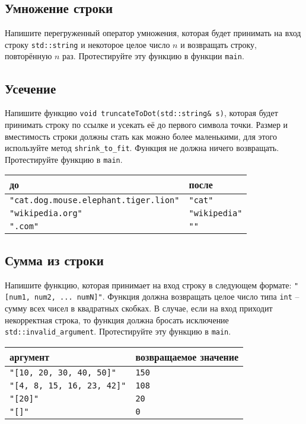 \documentclass{article}
\begin{document}
\subsection{Умножение строки}
Напишите перегруженный оператор умножения, которая будет принимать на вход строку \texttt{std::string} и некоторое целое число $n$ и возвращать строку, повторённую $n$ раз. Протестируйте эту функцию в функции \texttt{main}.


\subsection{Усечение}
Напишите функцию \texttt{void truncateToDot(std::string\& s)}, которая будет принимать строку по ссылке и усекать её до первого символа точки. Размер и вместимость строки должны стать как можно более маленькими, для этого используйте метод \texttt{shrink\_to\_fit}. Функция не должна ничего возвращать. Протестируйте функцию в \texttt{main}.
\begin{center}
\begin{tabular}{ l | l }
 до & после \\ \hline
 \texttt{"cat.dog.mouse.elephant.tiger.lion"} & \texttt{"cat"} \\
 \texttt{"wikipedia.org"} & \texttt{"wikipedia"}  \\ 
 \texttt{".com"} & \texttt{"{}"} \\
\end{tabular}
\end{center}


\subsection{Сумма из строки}
Напишите функцию, которая принимает на вход строку в следующем формате: \texttt{"[num1, num2, ... numN]"}.
Функция должна возвращать целое число типа \texttt{int} -- сумму всех чисел в квадратных скобках. В случае, если на вход приходит некорректная строка, то функция должна бросать исключение \texttt{std::invalid\_argument}. Протестируйте эту функцию в \texttt{main}.
\begin{center}
\begin{tabular}{ l | l }
 аргумент & возвращаемое значение \\ \hline
 \texttt{"[10, 20, 30, 40, 50]"} & \texttt{150} \\
 \texttt{"[4, 8, 15, 16, 23, 42]"} & \texttt{108}  \\ 
 \texttt{"[20]"} & \texttt{20} \\
 \texttt{"[]"} & \texttt{0} \\
\end{tabular}
\end{center}
\end{document}
